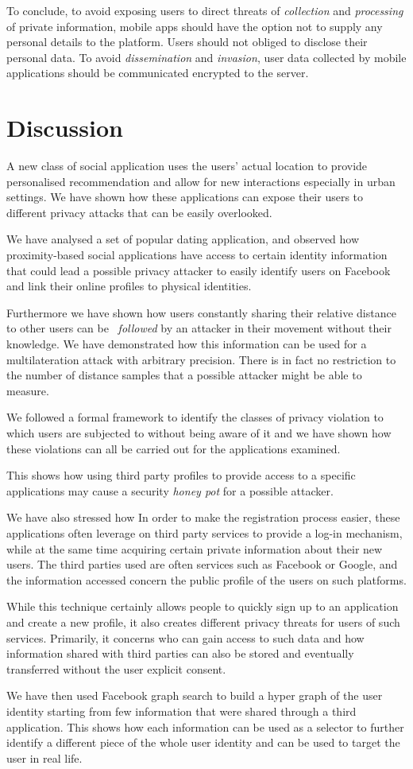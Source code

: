 To conclude, to avoid exposing users to direct threats of \emph{collection} and \emph{processing} of private information, mobile apps should have the option not to supply any personal details to the platform. Users should not obliged to disclose their personal data. To avoid \emph{dissemination} and \emph{invasion}, user data collected by mobile applications should be communicated encrypted to the server.

\section{Discussion}
\noindent
A new class of social application uses the users' actual location to provide personalised recommendation and allow for new interactions especially in urban settings. We have shown how these applications can expose their users to different privacy attacks that can be easily overlooked.

We have analysed a set of  popular dating application, and observed how proximity-based social applications have access to certain identity information that could lead a possible privacy attacker to easily identify users on Facebook and link their online profiles to physical identities.

Furthermore we have shown how users constantly sharing their relative distance to other users can be ~\emph{followed} by an attacker in their movement without their knowledge. We have demonstrated how this information can be used for a multilateration attack with arbitrary precision. There is in fact no restriction to the number of distance samples that a possible attacker might be able to measure.

We followed a formal framework to identify the classes of privacy violation to which users are subjected to without being aware of it and we have shown how these violations can all be carried out for the applications examined.

This shows how using third party profiles to provide access to a specific applications may cause a security \emph{honey pot} for a possible attacker.

We have also stressed how In order to make the registration process easier, these applications often leverage on third party services to provide a log-in mechanism, while at the same time acquiring certain private information about their new users. The third parties used are often services such as Facebook or Google, and the information accessed concern the public profile of the users on such platforms.

While this technique certainly allows people to quickly sign up to an application and create a new profile, it also creates different privacy threats for users of such services. Primarily, it concerns who can gain access to such data and how information shared with third parties can also be stored and eventually transferred without the user explicit consent.

We have then used Facebook graph search to build a hyper graph of the user identity starting from few information that were shared through a third application. This shows how each information can be used as a selector to further identify a different piece of the whole user identity and can be used to target the user in real life.